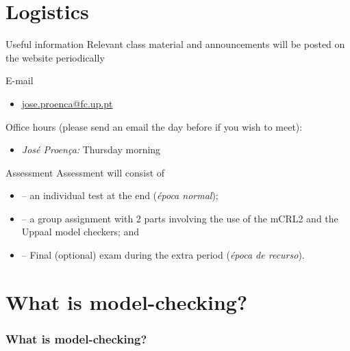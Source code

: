\documentclass[aspectratio=169]{beamer}
\begin{document}
\section{Logistics}

\begin{frame}{Useful information}
  Relevant class material and announcements will be posted on the website periodically

  

  \alert{E-mail}
    \begin{itemize}
      \item \href{mailto:jose.proenca@fc.up.pt}{jose.proenca@fc.up.pt} 
    \end{itemize}
           

  \alert{Office hours} (please send an email the day before if you wish to meet):
  \begin{itemize}
    \item \emph{José Proença:} Thursday morning
  \end{itemize} 
\end{frame}

\begin{frame}{Assessment}
  Assessment will consist of
  \begin{itemize}
  \item {} -- an individual \alert{test} at the end (\emph{época normal});
  \item {} -- a \alert{group assignment} with 2 parts involving the use of the mCRL2 and the Uppaal model checkers; and %
  \item {} -- Final (optional) exam during the extra period (\emph{época de recurso}).
  \end{itemize}
\end{frame}


\section{What is model-checking?}


\begin{frame}[t]\frametitle{What is model-checking?}


  \medskip


\end{frame}
\end{document}
